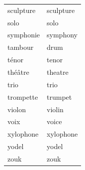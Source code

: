 \documentclass[12pt,a4paper]{article}
\begin{document}
\begin{longtable}{p{4cm} p{6cm}}
sculpture & sculpture \\
solo & solo \\
symphonie & symphony \\
tambour & drum \\
ténor & tenor \\
théâtre & theatre \\
trio & trio \\
trompette & trumpet \\
violon & violin \\
voix & voice \\
xylophone & xylophone \\
yodel & yodel \\
zouk & zouk \\
\bottomrule
\end{longtable}

\newpage
\end{document}
